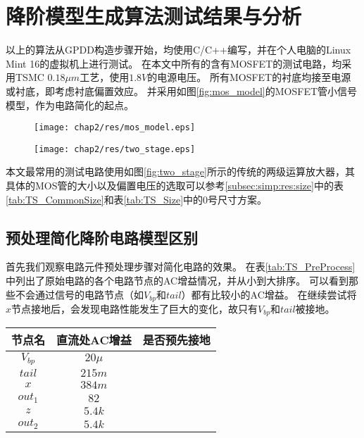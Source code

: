 \section{降阶模型生成算法测试结果与分析}
\label{sec:simp:res}

以上的算法从GPDD构造步骤开始，均使用C/C++编写，并在个人电脑的Linux Mint 16的虚拟机上进行测试。
在本文中所有的含有MOSFET的测试电路，均采用TSMC $0.18 \mu m$工艺，使用$1.8V$的电源电压。
所有MOSFET的衬底均接至电源或衬底，即考虑衬底偏置效应。
并采用如图\ref{fig:mos_model}的MOSFET管小信号模型，作为电路简化的起点。

\begin{figure}[!htp]
	\centering
	\texttt{[image: chap2/res/mos\_model.eps]}
\end{figure}

\begin{figure}[!htp]
	\centering
	\texttt{[image: chap2/res/two\_stage.eps]}
\end{figure}

本文最常用的测试电路使用如图\ref{fig:two_stage}所示的传统的两级运算放大器，其具体的MOS管的大小以及偏置电压的选取可以参考\ref{subsec:simp:res:size}中的表\ref{tab:TS_CommonSize}和表\ref{tab:TS_Size}中的0号尺寸方案。

\subsection{预处理简化降阶电路模型区别}
\label{subsec:simp:res:pre}

首先我们观察电路元件预处理步骤对简化电路的效果。
在表\ref{tab:TS_PreProcess}中列出了原始电路的各个电路节点的AC增益情况，并从小到大排序。
可以看到那些不会通过信号的电路节点（如$V_{bp}$和$tail$）都有比较小的AC增益。
在继续尝试将$x$节点接地后，会发现电路性能发生了巨大的变化，故只有$V_{bp}$和$tail$被接地。

\begin{table}[!htbp]
	\centering
	\begin{tabular}{c|c|c}
		\hline
		  节点名    & 直流处AC增益 &   是否预先接地   \\ \hline
		$V_{bp}$ & $20\mu$ & \checkmark \\
		 $tail$  & $215m$  & \checkmark \\
		  $x$    & $384m$  & \texttimes \\
		$out_1$  &  $82$   & \texttimes \\
		  $z$    & $5.4k$  & \texttimes \\
		$out_2$  & $5.4k$  & \texttimes \\ \hline
	\end{tabular}
\end{table}

